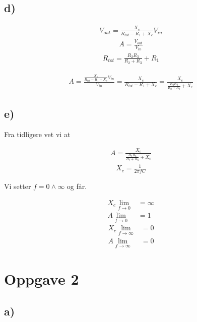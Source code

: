 \documentclass[11pt]{article}
\begin{document}
\subsection*{d)}

\begin{multicols}{3}
\noindent
\begin{align*}
V_{out} = \frac {X_{c}} {R_{tot}-R_{1}+X_{c}}V_{in}
\end{align*}
\begin{align*}
A = \frac {V_{out}} {V_{in}}
\end{align*}
\begin{align*}
R_{tot} = \frac{R_{2}R_{3}}{R_{2}+R_{3}} + R_{1}
\end{align*}
\end{multicols}
\begin{align*}
A = \frac{\frac{X_{c}}{R_{tot}-R_{1}+X_{c}}V_{in}}{V_{in}} = \frac{X_{c}}{R_{tot}-R_{1}+X_{c}} = \frac{X_{c}}{\frac{R_{2}R_{3}}{R_{2}+R_{3}}+X_{c}}
\end{align*}

\subsection*{e)}

Fra tidligere vet vi at
\begin{multicols}{2}\noindent
\begin{align*}
A = \frac{X_{c}}{\frac{R_{2}R_{3}}{R_{2}+R_{3}}+X_{c}}
\end{align*}
\begin{align*}
X_{c} = \frac{1}{2\pi fC}
\end{align*}
\end{multicols}
Vi setter $f = 0 \wedge \infty$ og får.
\begin{multicols}{2}\noindent
\begin{align*}
X_{c}\lim_{f \to 0} &= \infty \\
A\lim_{f \to 0} &= 1
\end{align*}
\begin{align*}
X_{c}\lim_{f \to \infty} &= 0 \\
A\lim_{f \to \infty} &= 0
\end{align*}
\end{multicols}

\section*{Oppgave 2}

\subsection*{a)}
\end{document}
